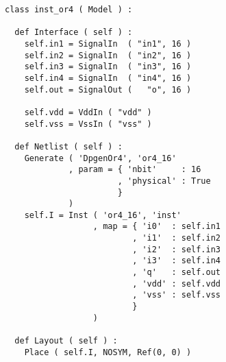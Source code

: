 \begin{itemize}
\begin{verbatim}
class inst_or4 ( Model ) :

  def Interface ( self ) :
    self.in1 = SignalIn  ( "in1", 16 )
    self.in2 = SignalIn  ( "in2", 16 )
    self.in3 = SignalIn  ( "in3", 16 )
    self.in4 = SignalIn  ( "in4", 16 )
    self.out = SignalOut (   "o", 16 )

    self.vdd = VddIn ( "vdd" )
    self.vss = VssIn ( "vss" )
    
  def Netlist ( self ) :
    Generate ( 'DpgenOr4', 'or4_16'
             , param = { 'nbit'     : 16
                       , 'physical' : True 
                       }
             )
    self.I = Inst ( 'or4_16', 'inst'
                  , map = { 'i0'  : self.in1
                          , 'i1'  : self.in2
                          , 'i2'  : self.in3
                          , 'i3'  : self.in4
                          , 'q'   : self.out
                          , 'vdd' : self.vdd
                          , 'vss' : self.vss
                          }
                  )
    
  def Layout ( self ) :
    Place ( self.I, NOSYM, Ref(0, 0) )
\end{verbatim}
\end{itemize}
